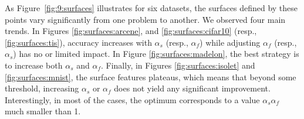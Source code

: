 As Figure~\ref{fig:9:surfaces} illustrates for six datasets, the
surfaces defined by these points vary significantly from one problem to
another. We observed four main trends. In Figures \ref{fig:surfaces:arcene},
and \ref{fig:surfaces:cifar10} (resp., \ref{fig:surfaces:tis}), accuracy
increases with $\alpha_s$ (resp., $\alpha_f$) while adjusting $\alpha_f$ (resp., $\alpha_s$) has no
or limited impact. In Figure \ref{fig:surfaces:madelon}, the best strategy is
to increase both $\alpha_s$ and $\alpha_f$. Finally, in Figures \ref{fig:surfaces:isolet}
and \ref{fig:surfaces:mnist}, the surface features plateaus, which means that
beyond some threshold, increasing $\alpha_s$ or $\alpha_f$ does not yield any significant
improvement. Interestingly, in most of the cases, the optimum corresponds to a
value $\alpha_s\alpha_f$ much smaller than 1.

